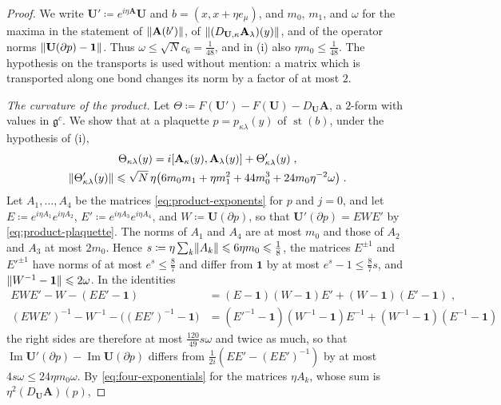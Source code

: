\documentclass[11pt]{preprint}
\newcommand{\id}{\mathbf 1}
\newcommand{\im}{\operatorname{Im}}
\DeclarePairedDelimiter{\norm}{\lVert}{\rVert}
\numberwithin{equation}{section}
\begin{document}
\begin{proof}
We write $\mathbf U' \coloneqq e^{i\eta\mathbf A}\mathbf U$ and $b = (x, x + \eta e_\mu)$, and $m_0$, $m_1$, and $\omega$ for the maxima in the statement of $\norm{\mathbf A(b')}$, of $\norm{(D_{\mathbf U,\kappa}\mathbf A_\lambda)(y)}$, and of the operator norms $\norm{\mathbf U(\partial p) - \id}$. Thus $\omega \leqslant \sqrt Nc_6 = \frac{1}{48}$, and in (i) also $\eta m_0 \leqslant \frac{1}{48}$. The hypothesis on the transports is used without mention: a matrix which is transported along one bond changes its norm by a factor of at most $2$.

\emph{The curvature of the product.} Let $\Theta \coloneqq F(\mathbf U') - F(\mathbf U) - D_{\mathbf U}\mathbf A$, a $2$-form with values in $\mathfrak g^c$. We show that at a plaquette $p = p_{\kappa\lambda}(y)$ of $\operatorname{st}(b)$, under the hypothesis of (i),
\begin{equation}\label{eq:curvature-product}
\begin{gathered}
    \Theta_{\kappa\lambda}(y) = i[\mathbf A_\kappa(y), \mathbf A_\lambda(y)] + \Theta'_{\kappa\lambda}(y)\;,\\
    \norm{\Theta'_{\kappa\lambda}(y)} \leqslant \sqrt N\,\eta\bigl(6m_0m_1 + \eta m_1^2 + 44m_0^3 + 24m_0\eta^{-2}\omega\bigr)\;.
\end{gathered}
\end{equation}
Let $A_1, \dots, A_4$ be the matrices \eqref{eq:product-exponents} for $p$ and $j = 0$, and let $E \coloneqq e^{i\eta A_1}e^{i\eta A_2}$, $E' \coloneqq e^{i\eta A_3}e^{i\eta A_4}$, and $W \coloneqq \mathbf U(\partial p)$, so that $\mathbf U'(\partial p) = EWE'$ by \eqref{eq:product-plaquette}. The norms of $A_1$ and $A_4$ are at most $m_0$ and those of $A_2$ and $A_3$ at most $2m_0$. Hence $s \coloneqq \eta\sum_k\norm{A_k} \leqslant 6\eta m_0 \leqslant \frac{1}{8}$, the matrices $E^{\pm1}$ and $E'^{\pm1}$ have norms of at most $e^s \leqslant \frac{8}{7}$ and differ from $\id$ by at most $e^s - 1 \leqslant \frac{8}{7}s$, and $\norm{W^{-1} - \id} \leqslant 2\omega$. In the identities
\begin{align*}
    EWE' - W - (EE' - \id) &= (E - \id)(W - \id)E' + (W - \id)(E' - \id)\;,\\
    (EWE')^{-1} - W^{-1} - \bigl((EE')^{-1} - \id\bigr) &= (E'^{-1} - \id)(W^{-1} - \id)E^{-1} + (W^{-1} - \id)(E^{-1} - \id)
\end{align*}
the right sides are therefore at most $\frac{120}{49}s\omega$ and twice as much, so that $\im\mathbf U'(\partial p) - \im\mathbf U(\partial p)$ differs from $\frac{1}{2i}(EE' - (EE')^{-1})$ by at most $4s\omega \leqslant 24\eta m_0\omega$. By \eqref{eq:four-exponentials} for the matrices $\eta A_k$, whose sum is $\eta^2(D_{\mathbf U}\mathbf A)(p)$,

\end{proof}
\end{document}
